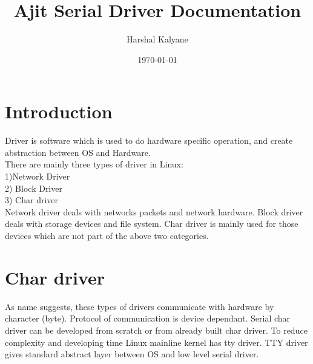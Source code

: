 \documentclass[12pt,a4paper]{article}
\title{Ajit Serial Driver Documentation}
\author{Harshal Kalyane }
\date{\today}
\newcommand{\tabtwo}[0]{\hspace{2em}}
\begin{document}
\maketitle

\newpage
\tableofcontents
\newpage

\section{Introduction}
\tabtwo Driver is software which is used to do hardware specific operation, and create abstraction between OS and Hardware.\\
There are mainly three types of driver in Linux: \\
 1)Network Driver \\ 2) Block Driver\\ 3) Char driver\\
Network driver deals with networks packets and  network hardware. Block driver deals with storage devices and file system. Char driver is mainly used for those devices which are not part of the above two categories.

\section{Char driver} 
\tabtwo As name suggests, these types of drivers communicate with hardware by character (byte). Protocol  of communication is device dependant. Serial char driver can be developed from scratch or from already built char driver. To reduce complexity and  developing time Linux mainline kernel has tty driver. TTY driver gives standard abstract layer between OS and low level serial driver.
\end{document}

